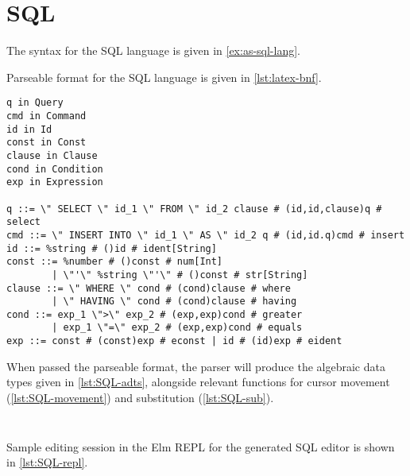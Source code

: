 \section{SQL}

The syntax for the SQL language is given in \cref{ex:as-sql-lang}.

Parseable format for the SQL language is given in \cref{lst:latex-bnf}.

\begin{lstlisting}[style=inline, caption={Parseable format of the SQL language syntax}, label={lst:SQL-bnf}]
q in Query
cmd in Command
id in Id
const in Const
clause in Clause
cond in Condition
exp in Expression

q ::= \" SELECT \" id_1 \" FROM \" id_2 clause # (id,id,clause)q # select
cmd ::= \" INSERT INTO \" id_1 \" AS \" id_2 q # (id,id.q)cmd # insert
id ::= %string # ()id # ident[String]
const ::= %number # ()const # num[Int] 
        | \"'\" %string \"'\" # ()const # str[String]
clause ::= \" WHERE \" cond # (cond)clause # where 
        | \" HAVING \" cond # (cond)clause # having
cond ::= exp_1 \">\" exp_2 # (exp,exp)cond # greater 
        | exp_1 \"=\" exp_2 # (exp,exp)cond # equals
exp ::= const # (const)exp # econst | id # (id)exp # eident
\end{lstlisting}

When passed the parseable format, the parser will produce the algebraic data types
given in \cref{lst:SQL-adts}, alongside relevant functions for cursor movement (\cref{lst:SQL-movement})
and substitution (\cref{lst:SQL-sub}).

\begin{lstlisting}[style=inline, language=elm, caption={Generated ADT for the SQL language}, label={lst:SQL-adts}]

\end{lstlisting}

\begin{lstlisting}[style=inline, language=elm, caption={Generated functions for cursor movement for the SLQ language}, label={lst:SQL-movement}]
\end{lstlisting}

Sample editing session in the Elm REPL for the generated SQL editor is
shown in \cref{lst:SQL-repl}.

